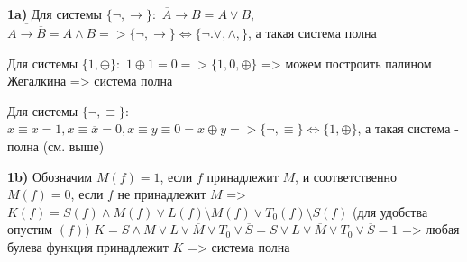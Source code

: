 \documentclass[12pt,a4paper,fleqn]{article}
\begin{document}
{\bf 1a)} Для системы $\{\lnot, \rightarrow\}:$ \newline
$\overline{A} \rightarrow B = A \lor B$, \newline
$\overline{A \rightarrow \overline{B}} = A \land B => \{\lnot, \rightarrow\} \iff \{\lnot. \lor, \land, \}$, а такая система полна \newline 

Для системы $\{1, \oplus\}:$ \newline
$1 \oplus 1 = 0 => \{1, 0, \oplus \}$ => можем построить палином Жегалкина => система полна \newline

Для системы $\{\lnot, \equiv\}:$ \newline
$x \equiv x = 1, x \equiv \overline{x} = 0, x \equiv y \equiv 0 = x \oplus y => \{\lnot, \equiv \} \iff \{1, \oplus\}$, а такая система - полна (см. выше) \newline

{\bf 1b)} Обозначим $M(f) = 1$, если $f$ принадлежит $M$, и соответственно $M(f) = 0$, если $f$ не принадлежит $M$ => \newline 
$K(f) = S(f) \land M(f) \lor L(f) \setminus M(f) \lor T_0(f) \setminus S(f) $ (для удобства опустим $(f)$)\newline
$K = S \land M \lor L \lor \overline{M} \lor T_0 \lor \overline{S} = S \lor L \lor \overline{M} \lor T_0 \lor \overline{S} = 1$ => любая булева функция принадлежит $K$ => система полна \newline
\end{document}

